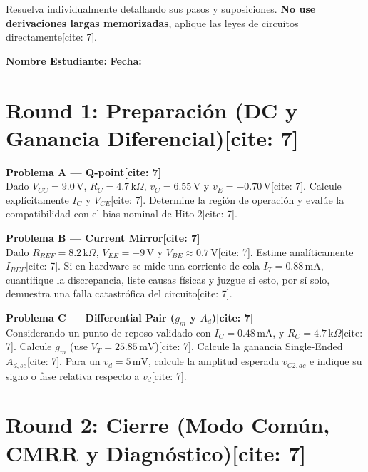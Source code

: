 \documentclass[11pt, a4paper]{article}
\begin{document}
\begin{tcolorbox}[colback=ucbblue!5, colframe=ucbblue, title=\textbf{Práctica Individual Tipo Examen: Consolidación Hito 2}]
    Resuelva individualmente detallando sus pasos y suposiciones. \textbf{No use derivaciones largas memorizadas}, aplique las leyes de circuitos directamente[cite: 7].
\end{tcolorbox}

\textbf{Nombre Estudiante:} \hrulefill \quad \textbf{Fecha:} \hrulefill

\vspace{0.3cm}
\section*{Round 1: Preparación (DC y Ganancia Diferencial)[cite: 7]}

\noindent \textbf{Problema A — Q-point[cite: 7]} \\
Dado $V_{CC}=9.0\,\text{V}$, $R_C=4.7\,\text{k}\Omega$, $v_C=6.55\,\text{V}$ y $v_E=-0.70\,\text{V}$[cite: 7]. 
Calcule explícitamente $I_C$ y $V_{CE}$[cite: 7]. Determine la región de operación y evalúe la compatibilidad con el bias nominal de Hito 2[cite: 7].
\vspace{3cm}

\noindent \textbf{Problema B — Current Mirror[cite: 7]} \\
Dado $R_{REF}=8.2\,\text{k}\Omega$, $V_{EE}=-9\,\text{V}$ y $V_{BE}\approx0.7\,\text{V}$[cite: 7]. 
Estime analíticamente $I_{REF}$[cite: 7]. Si en hardware se mide una corriente de cola $I_T=0.88\,\text{mA}$, cuantifique la discrepancia, liste causas físicas y juzgue si esto, por sí solo, demuestra una falla catastrófica del circuito[cite: 7].
\vspace{3cm}

\noindent \textbf{Problema C — Differential Pair ($g_m$ y $A_d$)[cite: 7]} \\
Considerando un punto de reposo validado con $I_C=0.48\,\text{mA}$, y $R_C=4.7\,\text{k}\Omega$[cite: 7].
Calcule $g_m$ (use $V_T=25.85\,\text{mV}$)[cite: 7]. Calcule la ganancia Single-Ended $A_{d,se}$[cite: 7]. Para un $v_d = 5\,\text{mV}$, calcule la amplitud esperada $v_{C2,ac}$ e indique su signo o fase relativa respecto a $v_d$[cite: 7].
\vspace{3.5cm}

\newpage
\section*{Round 2: Cierre (Modo Común, CMRR y Diagnóstico)[cite: 7]}
\end{document}
